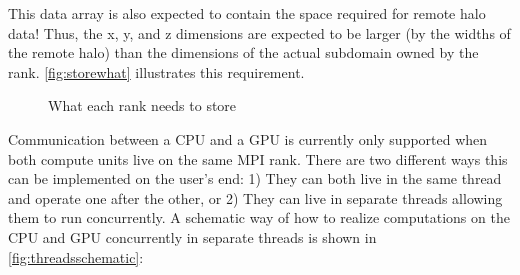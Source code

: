 \documentclass{article}
\begin{document}
This data array is also expected to contain the space required for remote halo data! Thus, the x, y, and z dimensions are expected to be larger (by the widths of the remote halo) than the dimensions of the actual subdomain owned by the rank. \autoref{fig:storewhat} illustrates this requirement.

\begin{figure}[ht]\centering
    \caption{What each rank needs to store \label{fig:storewhat}}
\end{figure}


Communication between a CPU and a GPU is currently only supported when both compute units live on the same MPI rank. There are two different ways this can be implemented on the user's end: 1) They can both live in the same thread and operate one after the other, or 2) They can live in separate threads allowing them to run concurrently. A schematic way of how to realize computations on the CPU and GPU concurrently in separate threads is shown in \autoref{fig:threadsschematic}:
\end{document}
